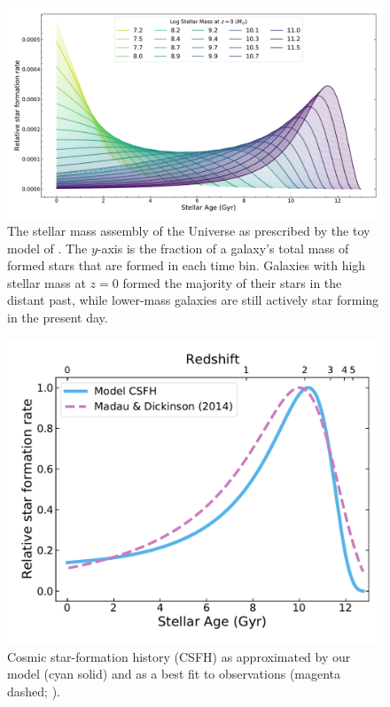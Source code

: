 \documentclass[fleqn,usenatbib]{mnras}
\begin{document}

\begin{figure}
    \centering
    \includegraphics[width=\textwidth]{figs/SFHs_colour.pdf}
    \caption{The stellar mass assembly of the Universe as prescribed by the toy model of . The $y$-axis is the fraction of a galaxy's total mass of formed stars that are formed in each time bin. Galaxies with high stellar mass at $z=0$ formed the majority of their stars in the distant past, while lower-mass galaxies are still actively star forming in the present day.}
    \label{fig:SFHs}
\end{figure}

\begin{figure}
    \centering
    \includegraphics[width=.5\textwidth]{figs/CSFH_MD14.pdf}
    \caption{Cosmic star-formation history (CSFH) as approximated by our model (cyan solid) and as a best fit to observations (magenta dashed; \citealt{Madau2014}).}%
    \label{fig:csfh}
\end{figure}

\end{document}
